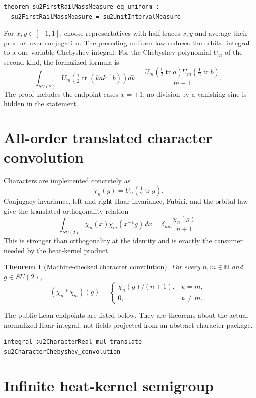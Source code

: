 \documentclass[11pt,a4paper]{article}
\newtheorem{theorem}{Theorem}[section]
\theoremstyle{remark}
\begin{document}
\begin{lstlisting}
theorem su2FirstRailMassMeasure_eq_uniform :
  su2FirstRailMassMeasure = su2UnitIntervalMeasure
\end{lstlisting}

For $x,y\in[-1,1]$, choose representatives with half-traces $x,y$ and average
their product over conjugation.  The preceding uniform law reduces the orbital
integral to a one-variable Chebyshev integral.  For the Chebyshev polynomial
$U_m$ of the second kind, the formalized formula is
\[
 \int_{SU(2)}
 U_m\!\left(\tfrac12\operatorname{tr}(kak^{-1}b)\right)dk
 =\frac{U_m(\tfrac12\operatorname{tr}a)
          U_m(\tfrac12\operatorname{tr}b)}{m+1}.
\]
The proof includes the endpoint cases $x=\pm1$; no division by a vanishing sine
is hidden in the statement.

\section{All-order translated character convolution}

Characters are implemented concretely as
\[
  \chi_n(g)=U_n\!\left(\tfrac12\operatorname{tr}g\right).
\]
Conjugacy invariance, left and right Haar invariance, Fubini, and the orbital
law give the translated orthogonality relation
\begin{equation}\label{eq:translated}
  \int_{SU(2)}\chi_n(x)\chi_m(x^{-1}g)\,dx
  =\delta_{nm}\frac{\chi_n(g)}{n+1}.
\end{equation}
This is stronger than orthogonality at the identity and is exactly the consumer
needed by the heat-kernel product.

\begin{theorem}[Machine-checked character convolution]
For every $n,m\in\mathbb N$ and $g\in SU(2)$,
\[
  (\chi_n*\chi_m)(g)=
  \begin{cases}
    \chi_n(g)/(n+1),&n=m,\\
    0,&n\ne m.
  \end{cases}
\]
\end{theorem}

The public Lean endpoints are listed below.  They are theorems about the actual
normalized Haar integral, not fields projected from an abstract character
package.
\begin{lstlisting}
integral_su2CharacterReal_mul_translate
su2CharacterChebyshev_convolution
\end{lstlisting}

\section{Infinite heat-kernel semigroup}
\end{document}
